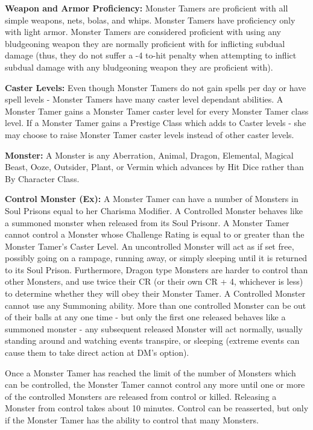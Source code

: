 \classfeatures

\textbf{Weapon and Armor Proficiency:} Monster Tamers are proficient with all simple weapons, nets, bolas, and whips. Monster Tamers have proficiency only with light armor. Monster Tamers are considered proficient with using any bludgeoning weapon they are normally proficient with for inflicting subdual damage (thus, they do not suffer a -4 to-hit penalty when attempting to inflict subdual damage with any bludgeoning weapon they are proficient with).

\textbf{Caster Levels:} Even though Monster Tamers do not gain spells per day or have spell levels - Monster Tamers have many caster level dependant abilities. A Monster Tamer gains a Monster Tamer caster level for every Monster Tamer class level. If a Monster Tamer gains a Prestige Class which adds to Caster levels - she may choose to raise Monster Tamer caster levels instead of other caster levels.

\textbf{Monster:} A Monster is any Aberration, Animal, Dragon, Elemental, Magical Beast, Ooze, Outsider, Plant, or Vermin which advances by Hit Dice rather than By Character Class.

\textbf{Control Monster (Ex):} A Monster Tamer can have a number of Monsters in Soul Prisons equal to her Charisma Modifier. A Controlled Monster behaves like a summoned monster when released from its Soul Prisonr. A Monster Tamer cannot control a Monster whose Challenge Rating is equal to or greater than the Monster Tamer's Caster Level.
An uncontrolled Monster will act as if set free, possibly going on a rampage, running away, or simply sleeping until it is returned to its Soul Prison. 
Furthermore, Dragon type Monsters are harder to control than other Monsters, and use twice their CR (or their own CR + 4, whichever is less) to determine whether they will obey their Monster Tamer. A Controlled Monster cannot use any Summoning ability. More than one controlled Monster can be out of their balls at any one time - but only the first one released behaves like a summoned monster - any subsequent released Monster will act normally, usually standing around and watching events transpire, or sleeping (extreme events can cause them to take direct action at DM's option).

Once a Monster Tamer has reached the limit of the number of Monsters which can be controlled, the Monster Tamer cannot control any more until one or more of the controlled Monsters are released from control or killed. Releasing a Monster from control takes about 10 minutes. Control can be reasserted, but only if the Monster Tamer has the ability to control that many Monsters.

